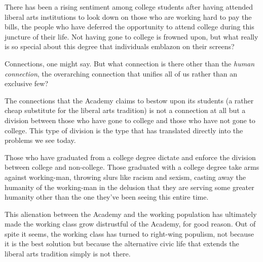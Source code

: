 \documentclass[12pt,letterpaper]{article}
\begin{document}
There has been a rising sentiment among college students after having attended liberal arts institutions to look down on those who are working hard to pay the bills, the people who have deferred the opportunity to attend college during this juncture of their life.  Not having gone to college is frowned upon, but what really is so special about this degree that individuals emblazon on their screens?

Connections, one might say.  But what connection is there other than the \textit{human connection}, the overarching connection that unifies all of us rather than an exclusive few?

The connections that the Academy claims to bestow upon its students (a rather cheap substitute for the liberal arts tradition) is not a connection at all but a division between those who have gone to college and those who have not gone to college.  This type of division is the type that has translated directly into the problems we see today.

Those who have graduated from a college degree dictate and enforce the division between college and non-college.  Those graduated with a college degree take arms against working-man, throwing slurs like racism and sexism, casting away the humanity of the working-man in the delusion that they are serving some greater humanity other than the one they've been seeing this entire time.

This alienation between the Academy and the working population has ultimately made the working class grow distrustful of the Academy, for good reason.  Out of spite it seems, the working class has turned to right-wing populism, not because it is the best solution but because the alternative civic life that extends the liberal arts tradition simply is not there.


%
%
%
%
%
%
\end{document}

